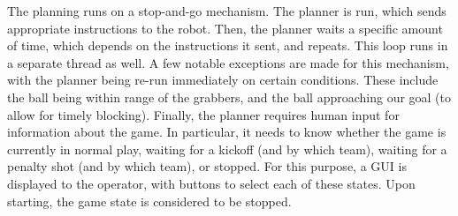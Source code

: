 The planning runs on a stop-and-go mechanism. The planner is run, which sends 
appropriate instructions to the robot. Then, the planner waits a specific
amount of time, which depends on the instructions it sent, and repeats. This
loop runs in a separate thread as well. A few notable exceptions are made for
this mechanism, with the planner being re-run immediately on certain
conditions. These include the ball being within range of the grabbers, and the
ball approaching our goal (to allow for timely blocking). Finally, the planner
requires human input for information about the game. In particular, it needs to
know whether the game is currently in normal play, waiting for a kickoff (and
by which team), waiting for a penalty shot (and by which team), or stopped. For
this purpose, a GUI is displayed to the operator, with buttons to select each
of these states. Upon starting, the game state is considered to be stopped.
